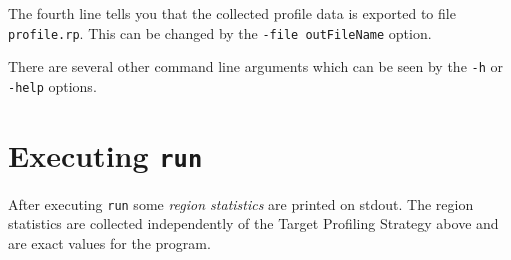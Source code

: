 \documentclass[12pt]{book}
\begin{document}
The fourth line tells you that the collected profile data is exported to
file \texttt{profile.rp}. This can be changed by the 
\texttt{-file outFileName} option.

There are several other command line arguments which can be seen by the
\texttt{-h} or \texttt{-help} options.

\section{Executing \texttt{run}}
After executing \texttt{run} some 
%
\emph{region statistics} are printed on stdout. The region statistics
are collected independently of the Target Profiling Strategy above and
are exact values for the program.
\end{document}
